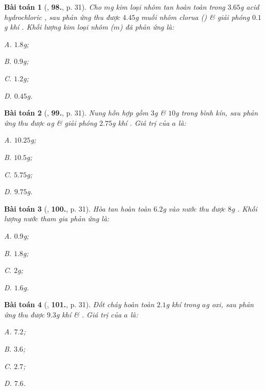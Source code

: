\documentclass{article}
\numberwithin{equation}{section}
\newtheorem{baitoan}{Bài toán}[section]
\begin{document}
\begin{baitoan}[\cite{An2011}, \textbf{98.}, p. 31]
	Cho $m$g kim loại nhôm tan hoàn toàn trong $3.65$g acid hydrochloric , sau phản ứng thu được $4.45$g muối nhôm clorua () \& giải phóng $0.1$g khí . Khối lượng kim loại nhôm ($m$) đã phản ứng là:
	\begin{enumerate*}
		\item[{\rm\sf A.}] $1.8$g;
		\item[{\rm\sf B.}] $0.9$g;
		\item[{\rm\sf C.}] $1.2$g;
		\item[{\rm\sf D.}] $0.45$g.
	\end{enumerate*}
\end{baitoan}

\begin{baitoan}[\cite{An2011}, \textbf{99.}, p. 31]
	Nung hỗn hợp gồm $3$g  \& $10$g  trong bình kín, sau phản ứng thu được $a$g  \& giải phóng $2.75$g khí . Giá trị của $a$ là:
	\begin{enumerate*}
		\item[{\rm\sf A.}] $10.25$g;
		\item[{\rm\sf B.}] $10.5$g;
		\item[{\rm\sf C.}] $5.75$g;
		\item[{\rm\sf D.}] $9.75$g.
	\end{enumerate*}
\end{baitoan}

\begin{baitoan}[\cite{An2011}, \textbf{100.}, p. 31]
	Hòa tan hoàn toàn $6.2$g  vào nước thu được $8$g . Khối lượng nước tham gia phản ứng là:
	\begin{enumerate*}
		\item[{\rm\sf A.}] $0.9$g;
		\item[{\rm\sf B.}] $1.8$g;
		\item[{\rm\sf C.}] $2$g;
		\item[{\rm\sf D.}] $1.6$g.
	\end{enumerate*}
\end{baitoan}

\begin{baitoan}[\cite{An2011}, \textbf{101.}, p. 31]
	Đốt cháy hoàn toàn $2.1$g khí  trong $a$g oxi, sau phản ứng thu được $9.3$g khí  \& . Giá trị của $a$ là:
	\begin{enumerate*}
		\item[{\rm\sf A.}] $7.2$;
		\item[{\rm\sf B.}] $3.6$;
		\item[{\rm\sf C.}] $2.7$;
		\item[{\rm\sf D.}] $7.6$.
	\end{enumerate*}
\end{baitoan}
\end{document}
